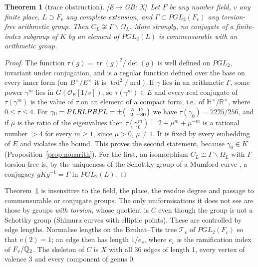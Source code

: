 \documentclass[11pt]{amsart}
\numberwithin{equation}{section}
\theoremstyle{plain}
\newtheorem{theorem}{Theorem}[section]
\theoremstyle{definition}\newtheorem{definition}[theorem]{Definition}
\theoremstyle{remark}\newtheorem{remark}[theorem]{Remark}
\newcommand{\ctag}[1]{\textup{\textsf{\scriptsize[#1]}}}
\begin{document}
\begin{theorem}[trace obstruction]\label{thm:trace}
\ctag{E$\to$GB; X}\ Let $F$ be any number field, $v$ any finite place, $L\supset F_v$ any complete extension, and $\Gamma\subset PGL_2(F_v)$ any torsion-free arithmetic group. Then $C_L\not\cong\Gamma\backslash\Omega_L$. More strongly, no conjugate of a finite-index subgroup of $K$ by an element of $PGL_2(L)$ is commensurable with an arithmetic group.
\end{theorem}
\begin{proof}
The function $\tau(g)=\operatorname{tr}(g)^2/\det(g)$ is well defined on $PGL_2$, invariant under conjugation, and is a regular function defined over the base on every inner form (on $B^\times/E^\times$ it is $\operatorname{trd}^2/\operatorname{nrd}$). If $\gamma$ lies in an arithmetic $\Gamma$, some power $\gamma^m$ lies in $G(\mathcal O_E[1/v])$, so $\tau(\gamma^m)\in E$ and every real conjugate of $\tau(\gamma^m)$ is the value of $\tau$ on an element of a compact form, i.e.\ of $\mathbb H^\times/\mathbb R^\times$, where $0\le\tau\le4$. For $\gamma_0=PLRLPRPL=\pm\begin{psmallmatrix}-5&12\\12&-80\end{psmallmatrix}$ we have $\tau(\gamma_0)=7225/256$, and if $\mu$ is the ratio of the eigenvalues then $\tau(\gamma_0^m)=2+\mu^m+\mu^{-m}$ is a rational number $>4$ for every $m\ge1$, since $\mu>0$, $\mu\ne1$. It is fixed by every embedding of $E$ and violates the bound. This proves the second statement, because $\gamma_0\in K$ (Proposition~\ref{prop:nonarith}). For the first, an isomorphism $C_L\cong\Gamma\backslash\Omega_L$ with $\Gamma$ torsion-free is, by the uniqueness of the Schottky group of a Mumford curve \cite{mumford72,gvdp80}, a conjugacy $gKg^{-1}=\Gamma$ in $PGL_2(L)$.
\end{proof}

Theorem~\ref{thm:trace} is insensitive to the field, the place, the residue degree and passage to commensurable or conjugate groups. The only uniformisations it does not see are those by groups \emph{with torsion}, whose quotient is $C$ even though the group is not a Schottky group (Shimura curves with elliptic points). These are controlled by edge lengths. Normalise lengths on the Bruhat--Tits tree $\mathcal T_v$ of $PGL_2(F_v)$ so that $v(2)=1$; an edge then has length $1/e_v$, where $e_v$ is the ramification index of $F_v/\mathbb{Q}_2$. The skeleton of $C$ is $X$ with all 36 edges of length 1, every vertex of valence 3 and every component of genus 0.
\end{document}
